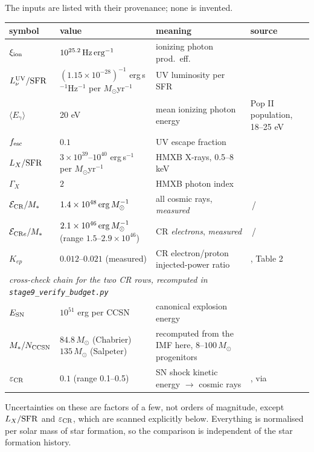 \documentclass[11pt,a4paper]{article}
\begin{document}
The inputs are listed with their provenance; none is invented.
\begin{center}
\footnotesize
\begin{tabular}{p{1.7cm}p{3.5cm}p{4.5cm}p{4.6cm}}
\toprule
symbol & value & meaning & source \\
\midrule
$\xi_{\rm ion}$ & $10^{25.2}\,{\rm Hz\,erg^{-1}}$ & ionizing photon prod.\ eff.
  & \citet{robertson15,bouwens16} \\
$L_\nu^{\rm UV}/{\rm SFR}$ & $(1.15\times10^{-28})^{-1}$ \newline erg\,s$^{-1}$Hz$^{-1}$ per $M_\odot$yr$^{-1}$ & UV luminosity per SFR
  & \citet{kennicutt98,madau14} \\
$\langle E_\gamma\rangle$ & 20 eV & mean ionizing photon energy
  & Pop II population, 18--25 eV \\
$f_{\rm esc}$ & $0.1$ & UV escape fraction
  & \citet{robertson15,finkelstein19} \\
$L_X/{\rm SFR}$ & $3\times10^{39}$--$10^{40}$ \newline erg\,s$^{-1}$ per $M_\odot$yr$^{-1}$
  & HMXB X-rays, 0.5--8 keV
  & \citet{mineo12,fragos13,lehmer21} \\
$\Gamma_X$ & $2$ & HMXB photon index & \citet{fragos13} \\
$\mathcal{E}_{\rm CR}/M_\ast$ & $1.4\times10^{48}\,{\rm erg}\,M_\odot^{-1}$
  & all cosmic rays, \emph{measured}
  & \citet{strong10}\,/\,\citet{licquia15} \\
$\mathcal{E}_{{\rm CR}e}/M_\ast$ & $2.1\times10^{46}\,{\rm erg}\,M_\odot^{-1}$
  \newline (range $1.5$--$2.9\times10^{46}$)
  & CR \emph{electrons}, \emph{measured}
  & \citet{strong10}\,/\,\citet{licquia15} \\
$K_{ep}$ & $0.012$--$0.021$ (measured) & CR electron/proton injected-power
  ratio & \citet{strong10}, Table 2 \\
\midrule
\multicolumn{4}{l}{\emph{cross-check chain for the two CR rows, recomputed in
  \texttt{stage9\_verify\_budget.py}}} \\
$E_{\rm SN}$ & $10^{51}$ erg per CCSN & canonical explosion energy
  & \citet{woosley95} \\
$M_\ast/N_{\rm CCSN}$ & $84.8\,M_\odot$ (Chabrier) \newline $135\,M_\odot$ (Salpeter)
  & recomputed from the IMF here, $8$--$100\,M_\odot$ progenitors
  & \citet{chabrier03,salpeter55} \\
$\varepsilon_{\rm CR}$ & $0.1$ (range 0.1--0.5) & SN shock kinetic energy
  $\to$ cosmic rays
  & \citet{drury89,caprioli14}, via \citet{gesseyjones23} \\
\bottomrule
\end{tabular}
\end{center}
Uncertainties on these are factors of a few, not orders of magnitude, except
$L_X/{\rm SFR}$ and $\varepsilon_{\rm CR}$, which are scanned explicitly below.
Everything is normalised per solar mass of star formation, so the comparison is
independent of the star formation history.
\end{document}
